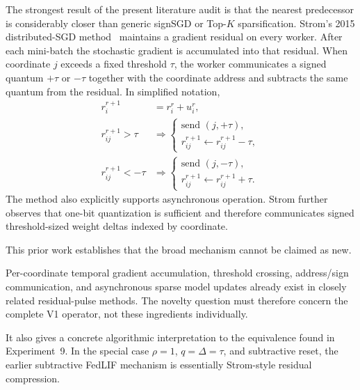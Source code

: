 The strongest result of the present literature audit is that the nearest predecessor is considerably closer than generic signSGD or Top-$K$ sparsification. Strom's 2015 distributed-SGD method~\cite{strom2015distributed} maintains a gradient residual on every worker. After each mini-batch the stochastic gradient is accumulated into that residual. When coordinate $j$ exceeds a fixed threshold $\tau$, the worker communicates a signed quantum $+\tau$ or $-\tau$ together with the coordinate address and subtracts the same quantum from the residual. In simplified notation,
\begin{align}
 r_i^{r+1} &= r_i^r+u_i^r,\\
 r_{ij}^{r+1}>\tau
 &\Rightarrow
 \begin{cases}
   \text{send }(j,+\tau),\\
   r_{ij}^{r+1}\leftarrow r_{ij}^{r+1}-\tau,
 \end{cases}\\
 r_{ij}^{r+1}<-\tau
 &\Rightarrow
 \begin{cases}
   \text{send }(j,-\tau),\\
   r_{ij}^{r+1}\leftarrow r_{ij}^{r+1}+\tau.
 \end{cases}
\end{align}
The method also explicitly supports asynchronous operation. Strom further observes that one-bit quantization is sufficient and therefore communicates signed threshold-sized weight deltas indexed by coordinate.

This prior work establishes that the broad mechanism cannot be claimed as new.
\begin{takeawaybox}[title={Q1 prior-art boundary}]
Per-coordinate temporal gradient accumulation, threshold crossing, address/sign communication, and asynchronous sparse model updates already exist in closely related residual-pulse methods. The novelty question must therefore concern the complete V1 operator, not these ingredients individually.
\end{takeawaybox}
It also gives a concrete algorithmic interpretation to the equivalence found in Experiment~9. In the special case $\rho=1$, $q=\Delta=\tau$, and subtractive reset, the earlier subtractive FedLIF mechanism is essentially Strom-style residual compression.

